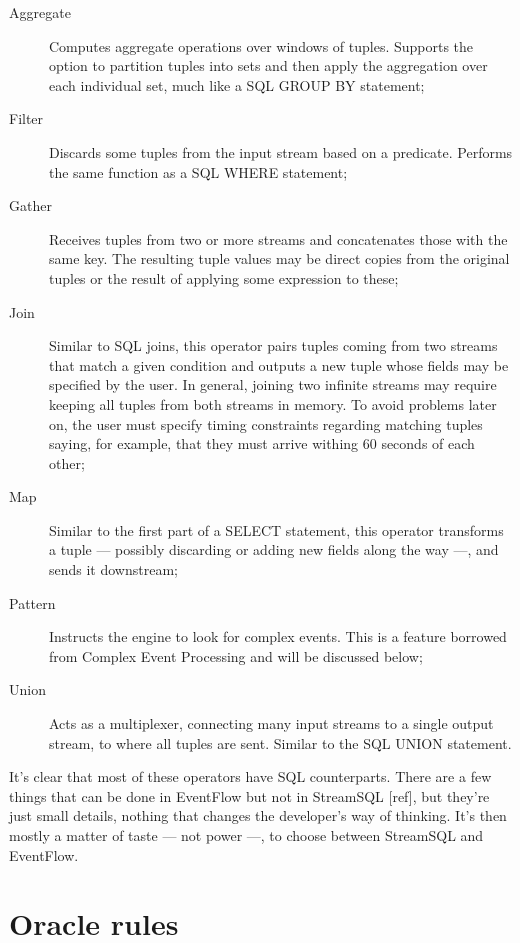 \documentclass{report}
\begin{document}
\begin{description}
\item [Aggregate] Computes aggregate operations over windows of
  tuples. Supports the option to partition tuples into sets and then
  apply the aggregation over each individual set, much like a SQL
  GROUP BY statement;
\item [Filter] Discards some tuples from the input stream based on a
  predicate. Performs the same function as a SQL WHERE statement;
\item [Gather] Receives tuples from two or more streams and
  concatenates those with the same key. The resulting tuple values may
  be direct copies from the original tuples or the result of applying
  some expression to these;
\item [Join] Similar to SQL joins, this operator pairs tuples coming
  from two streams that match a given condition and outputs a new
  tuple whose fields may be specified by the user. In general, joining
  two infinite streams may require keeping all tuples from both
  streams in memory. To avoid problems later on, the user must specify
  timing constraints regarding matching tuples saying, for example,
  that they must arrive withing 60 seconds of each other;
\item [Map] Similar to the first part of a SELECT statement, this
  operator transforms a tuple --- possibly discarding or adding new
  fields along the way ---, and sends it downstream;
\item [Pattern] Instructs the engine to look for complex events. This
  is a feature borrowed from Complex Event Processing and will be
  discussed below;
\item [Union] Acts as a multiplexer, connecting many input streams to
  a single output stream, to where all tuples are sent. Similar to the
  SQL UNION statement.
\end{description}

It's clear that most of these operators have SQL counterparts. There
are a few things that can be done in EventFlow but not in StreamSQL
[ref], but they're just small details, nothing that changes the
developer's way of thinking. It's then mostly a matter of taste ---
not power ---, to choose between StreamSQL and EventFlow.

\section{Oracle rules}
\label{sec:orm}
\end{document}

